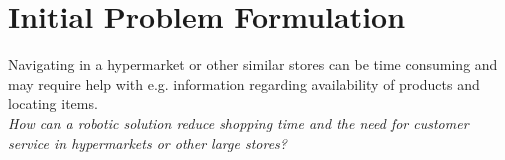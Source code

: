 \section{Initial Problem Formulation}\label{sec:initial}
Navigating in a hypermarket or other similar stores can be time consuming and may require help with e.g. information regarding availability of products and locating items. \\
\textit{How can a robotic solution reduce shopping time and the need for customer service in hypermarkets or other large stores?}\\

